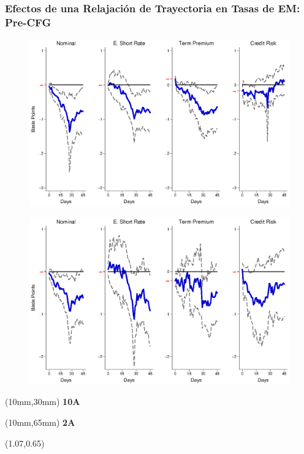 \documentclass[12pt, aspectratio=169, xcolor=dvipsnames]{beamer}
\begin{document}
\begin{frame}[label=FGEMpre]
\frametitle{Efectos de una Relajación de Trayectoria en Tasas de EM: Pre-CFG}
\begin{figure}[!htbp]
	\begin{center} %
		\includegraphics[trim={0cm 0cm 0cm 0cm},clip,height=0.45\textheight,width=0.85\linewidth]{../Figures/LPs/LagDep-FX/Path/EM/PathEMnomyptpphi120mPre.eps}
		\par\end{center}
\end{figure}
\vspace{-0.5cm}
\begin{figure}[!htbp]
	\begin{center} %
		\includegraphics[trim={0cm 0cm 0cm 0.76cm},clip,height=0.45\textheight,width=0.85\linewidth]{../Figures/LPs/LagDep-FX/Path/EM/PathEMnomyptpphi24mPre.eps}
		\par\end{center}
\end{figure}
\begin{textblock*}{8mm}(10mm,30mm)
	\small \textbf{10A}
\end{textblock*}
\begin{textblock*}{8mm}(10mm,65mm)
	\small \textbf{2A}
\end{textblock*}
\begin{textblock*}{5cm}(1.07\textwidth,0.65\textheight)
	\hyperlink{FGUSpre}{}
\end{textblock*}
\end{frame}
\end{document}
